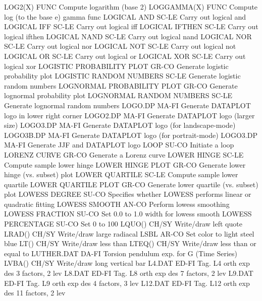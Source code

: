 LOG2(X)                     FUNC  Compute logarithm (base 2)
LOGGAMMA(X)                 FUNC  Compute log (to the base e) gamma func
LOGICAL AND                 SC-LE Carry out logical and
LOGICAL IFF                 SC-LE Carry out logical iff
LOGICAL IFTHEN              SC-LE Carry out logical ifthen
LOGICAL NAND                SC-LE Carry out logical nand
LOGICAL NOR                 SC-LE Carry out logical nor
LOGICAL NOT                 SC-LE Carry out logical not
LOGICAL OR                  SC-LE Carry out logical or
LOGICAL XOR                 SC-LE Carry out logical xor
LOGISTIC PROBABILITY PLOT   GR-CO Generate logistic probability plot
LOGISTIC RANDOM NUMBERS     SC-LE Generate logistic random numbers
LOGNORMAL PROBABILITY PLOT  GR-CO Generate lognormal probability plot
LOGNORMAL RANDOM NUMBERS    SC-LE Generate lognormal random numbers
LOGO.DP                     MA-FI Generate DATAPLOT logo in lower right corner
LOGO2.DP                    MA-FI Generate DATAPLOT logo (larger size)
LOGO3.DP                    MA-FI Generate DATAPLOT logo (for landscape-mode)
LOGO3B.DP                   MA-FI Generate DATAPLOT logo (for portrait-mode)
LOGO3.DP                    MA-FI Generate JJF and DATAPLOT logo
LOOP                        SU-CO Initiate a loop
LORENZ CURVE                GR-CO Generate a Lorenz curve
LOWER HINGE                 SC-LE Compute sample lower hinge
LOWER HINGE PLOT            GR-CO Generate lower hinge (vs. subset) plot
LOWER QUARTILE              SC-LE Compute sample lower quartile
LOWER QUARTILE PLOT         GR-CO Generate lower quartile (vs. subset) plot
LOWESS DEGREE               SU-CO Specifies whether LOWESS performs linear or quadratic fitting
LOWESS SMOOTH               AN-CO Perform lowess smoothing
LOWESS FRACTION             SU-CO Set 0.0 to 1.0 width for lowess smooth
LOWESS PERCENTAGE           SU-CO Set 0 to 100%
LQUO()                      CH/SY Write/draw left quote
LRAD()                      CH/SY Write/draw large radiacal
LSBL                        AR-CO Set color to light steel blue
LT()                        CH/SY Write/draw less than
LTEQ()                      CH/SY Write/draw less than or equal to
LUTHER.DAT                  DA-FI Torsion pendulum exp. for G (Time Series)
LVBA()                      CH/SY Write/draw long vertical bar
L4.DAT                      ED-FI Tag. L4   orth exp des  3 factors,   2 lev
L8.DAT                      ED-FI Tag. L8   orth exp des  7 factors,   2 lev
L9.DAT                      ED-FI Tag. L9   orth exp des  4 factors,   3 lev
L12.DAT                     ED-FI Tag. L12  orth exp des 11 factors,   2 lev
